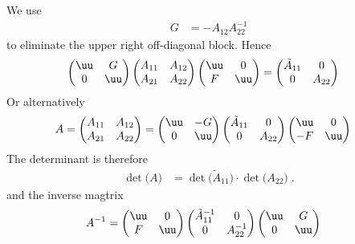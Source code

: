 %
We use 
%
\begin{align*}
G&= - A_{12}A_{22}^{-1}
\end{align*}
%
to eliminate the upper right off-diagonal block. Hence
%
\begin{align*}
\begin{pmatrix}
  \uu& G  \\
  0 & \uu
\end{pmatrix}
%
\begin{pmatrix}
 A_{11} & A_{12} \\
A_{21}  & A_{22}
\end{pmatrix}
%
\begin{pmatrix}
  \uu& 0  \\
  F & \uu
\end{pmatrix} &=
\begin{pmatrix}
  \tilde A_{11}& 0 \\
0  & A_{22}
\end{pmatrix}
%
\end{align*}
%
Or alternatively
%
\begin{align*}
A = 
\begin{pmatrix}
 A_{11} & A_{12} \\
A_{21}  & A_{22}
\end{pmatrix}
&=
\begin{pmatrix}
  \uu& -G  \\
  0 & \uu
\end{pmatrix}
%
\begin{pmatrix}
  \tilde A_{11}& 0 \\
0  & A_{22}
\end{pmatrix}
%
\begin{pmatrix}
  \uu& 0  \\
  -F & \uu
\end{pmatrix} 
\end{align*}
%
The determinant is therefore
%
\begin{align*}
\det\big(A\big) &= \det\big( \tilde A_{11} \big)\cdot \det\big( A_{22} \big)\;.
\end{align*}
%
and the inverse magtrix
%
\begin{align*}
A^{-1} &= 
%
\begin{pmatrix}
  \uu& 0  \\
  F & \uu
\end{pmatrix} 
\begin{pmatrix}
  \tilde A_{11}^{-1}& 0 \\
0  & A_{22}^{-1}
\end{pmatrix}
\begin{pmatrix}
  \uu& G  \\
  0 & \uu
\end{pmatrix}
\end{align*}
